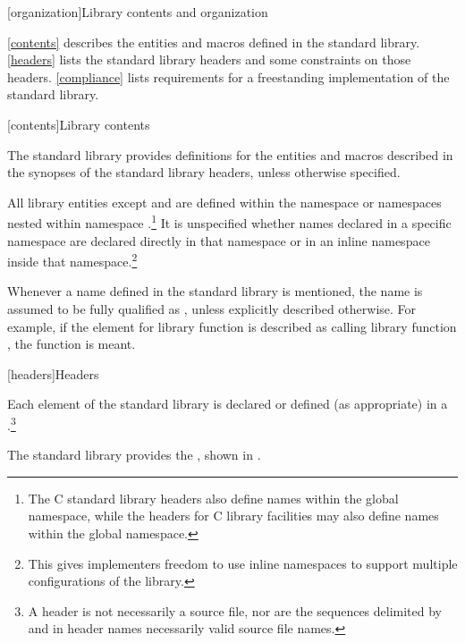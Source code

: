 [organization]{Library contents and organization}

\pnum
\ref{contents} describes the entities and macros defined in the \Cpp{} standard library.
\ref{headers} lists the standard library headers and some constraints on those headers.
\ref{compliance} lists requirements for a freestanding implementation of the \Cpp{}
standard library.

[contents]{Library contents}

\pnum
The \Cpp{} standard library provides definitions
for the entities and macros described in the synopses
of the \Cpp{} standard library headers,
unless otherwise specified.

\pnum
All library entities except
and
are defined within the namespace
or namespaces nested within namespace
.\footnote{The C standard library headers also define
names within the global namespace, while the \Cpp{} headers for C library
facilities may also define names within the global namespace.}%
It is unspecified whether names declared in a specific namespace are declared
directly in that namespace or in an inline namespace inside that
namespace.\footnote{This gives implementers freedom to use inline namespaces to
support multiple configurations of the library.}

\pnum
Whenever a name  defined in the standard library is mentioned,
the name  is assumed to be fully qualified as
,
unless explicitly described otherwise. For example, if the \effects element
for library function  is described as calling library function ,
the function
is meant.

[headers]{Headers}

\pnum
Each element of the \Cpp{} standard library is declared or defined (as appropriate) in a
.\footnote{A header is not necessarily a source file, nor are the
sequences delimited by \tcode{<} and \tcode{>} in header names necessarily valid source
file names.}

\pnum
The \Cpp{} standard library provides the
,
shown in .

